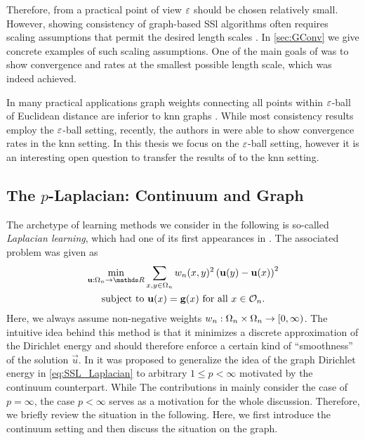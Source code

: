 %
%
Therefore, from a practical point of view $\varepsilon$ should be chosen relatively small. However, showing consistency of graph-based SSl algorithms often requires scaling assumptions that permit the desired length scales \cite{GarcSlep15, slepcev2019analysis, calder2019consistency}. In \cref{sec:GConv} we give concrete examples of such scaling assumptions. One of the main goals of \cite{roith2022continuum, bungert2021uniform} was to show convergence and rates at the smallest possible length scale, which was indeed achieved.
%
%
%
\begin{remark}{}{}
In many practical applications graph weights connecting all points within $\varepsilon$-ball of Euclidean distance are inferior to knn graphs \cite{calder2020poisson, flores2019algorithms, calder2022improved}. While most consistency results employ the $\varepsilon$-ball setting, recently, the authors in \cite{calder2022improved} were able to show convergence rates in the knn setting. In this thesis we focus on the $\varepsilon$-ball setting, however it is an interesting open question to transfer the results of \cite{roith2022continuum, bungert2021uniform, bungert2022ratio} to the knn setting.
\end{remark}
%
%
%
%
\subsection{The $p$-Laplacian: Continuum and Graph}\label{sec:pLap}
%
%
The archetype of learning methods we consider in the following is so-called \emph{Laplacian learning}, which had one of its first appearances in 
\cite{zhu2003semi}. The associated problem was given as
%
\begin{gather}\label{eq:SSL_Laplacian}
	\begin{gathered}
		\min_{\vec u:\domain_n\to\R} \sum_{x,y\in\domain_n} w_n(x,y)^2 
		\left(\vec u(y) - \vec u(x) \right)^2\\
		\text{subject to } \vec u(x) = \vec g(x) \text{ for all } x\in\conset_n.
	\end{gathered}
\end{gather}
%
%
%
Here, we always assume non-negative weights $w_n:\Omega_n\times\Omega_n\to[0,\infty)$. The intuitive idea behind this method is that it minimizes a discrete approximation of the Dirichlet energy and should therefore enforce a certain kind of \enquote{smoothness} of the solution $\vec u$. In \cite{zhou2005regularization} it was proposed to generalize the idea of the graph Dirichlet energy in \cref{eq:SSL_Laplacian} to arbitrary $1\leq p < \infty$ motivated by the continuum counterpart. While The contributions in \cite{roith2022continuum, bungert2021uniform, bungert2022ratio} mainly consider the case of $p=\infty$, the case $p<\infty$ serves as a  motivation for the whole discussion. Therefore, we briefly review the situation in the following. Here, we first introduce the continuum setting and then discuss the situation on the graph.
%
%
%
%
